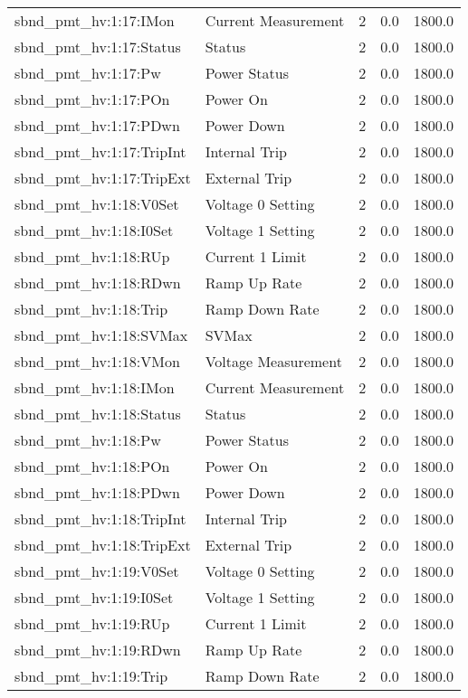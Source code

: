 \begin{center}
\begin{longtable}{l | l l l l }
sbnd\_pmt\_hv:1:17:IMon & Current Measurement & 2 & 0.0 & 1800.0\\ 
sbnd\_pmt\_hv:1:17:Status & Status & 2 & 0.0 & 1800.0\\ 
sbnd\_pmt\_hv:1:17:Pw & Power Status & 2 & 0.0 & 1800.0\\ 
sbnd\_pmt\_hv:1:17:POn & Power On & 2 & 0.0 & 1800.0\\ 
sbnd\_pmt\_hv:1:17:PDwn & Power Down & 2 & 0.0 & 1800.0\\ 
sbnd\_pmt\_hv:1:17:TripInt & Internal Trip & 2 & 0.0 & 1800.0\\ 
sbnd\_pmt\_hv:1:17:TripExt & External Trip & 2 & 0.0 & 1800.0\\ 
sbnd\_pmt\_hv:1:18:V0Set & Voltage 0 Setting & 2 & 0.0 & 1800.0\\ 
sbnd\_pmt\_hv:1:18:I0Set & Voltage 1 Setting & 2 & 0.0 & 1800.0\\ 
sbnd\_pmt\_hv:1:18:RUp & Current 1 Limit & 2 & 0.0 & 1800.0\\ 
sbnd\_pmt\_hv:1:18:RDwn & Ramp Up Rate & 2 & 0.0 & 1800.0\\ 
sbnd\_pmt\_hv:1:18:Trip & Ramp Down Rate & 2 & 0.0 & 1800.0\\ 
sbnd\_pmt\_hv:1:18:SVMax & SVMax & 2 & 0.0 & 1800.0\\ 
sbnd\_pmt\_hv:1:18:VMon & Voltage Measurement & 2 & 0.0 & 1800.0\\ 
sbnd\_pmt\_hv:1:18:IMon & Current Measurement & 2 & 0.0 & 1800.0\\ 
sbnd\_pmt\_hv:1:18:Status & Status & 2 & 0.0 & 1800.0\\ 
sbnd\_pmt\_hv:1:18:Pw & Power Status & 2 & 0.0 & 1800.0\\ 
sbnd\_pmt\_hv:1:18:POn & Power On & 2 & 0.0 & 1800.0\\ 
sbnd\_pmt\_hv:1:18:PDwn & Power Down & 2 & 0.0 & 1800.0\\ 
sbnd\_pmt\_hv:1:18:TripInt & Internal Trip & 2 & 0.0 & 1800.0\\ 
sbnd\_pmt\_hv:1:18:TripExt & External Trip & 2 & 0.0 & 1800.0\\ 
sbnd\_pmt\_hv:1:19:V0Set & Voltage 0 Setting & 2 & 0.0 & 1800.0\\ 
sbnd\_pmt\_hv:1:19:I0Set & Voltage 1 Setting & 2 & 0.0 & 1800.0\\ 
sbnd\_pmt\_hv:1:19:RUp & Current 1 Limit & 2 & 0.0 & 1800.0\\ 
sbnd\_pmt\_hv:1:19:RDwn & Ramp Up Rate & 2 & 0.0 & 1800.0\\ 
sbnd\_pmt\_hv:1:19:Trip & Ramp Down Rate & 2 & 0.0 & 1800.0\\ 

\end{longtable}
\end{center}
